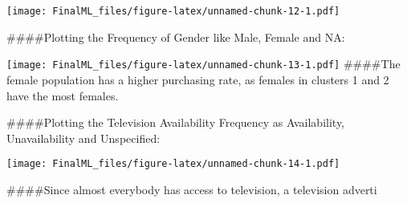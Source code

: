 \documentclass[
]{article}
\newenvironment{Shaded}{\begin{snugshade}}{\end{snugshade}}
\newcommand{\AttributeTok}[1]{\textcolor[rgb]{0.77,0.63,0.00}{#1}}
\newcommand{\FunctionTok}[1]{\textcolor[rgb]{0.00,0.00,0.00}{#1}}
\newcommand{\NormalTok}[1]{#1}
\newcommand{\SpecialCharTok}[1]{\textcolor[rgb]{0.00,0.00,0.00}{#1}}
\newcommand{\StringTok}[1]{\textcolor[rgb]{0.31,0.60,0.02}{#1}}
\begin{document}
\texttt{[image: FinalML\_files/figure-latex/unnamed-chunk-12-1.pdf]}

\#\#\#\#Plotting the Frequency of Gender like Male, Female and NA:

\begin{Shaded}
\end{Shaded}

\texttt{[image: FinalML\_files/figure-latex/unnamed-chunk-13-1.pdf]}
\#\#\#\#The female population has a higher purchasing rate, as females
in clusters 1 and 2 have the most females.

\#\#\#\#Plotting the Television Availability Frequency as Availability,
Unavailability and Unspecified:

\begin{Shaded}
\end{Shaded}

\texttt{[image: FinalML\_files/figure-latex/unnamed-chunk-14-1.pdf]}

\#\#\#\#Since almost everybody has access to television, a television
adverti
\end{document}
